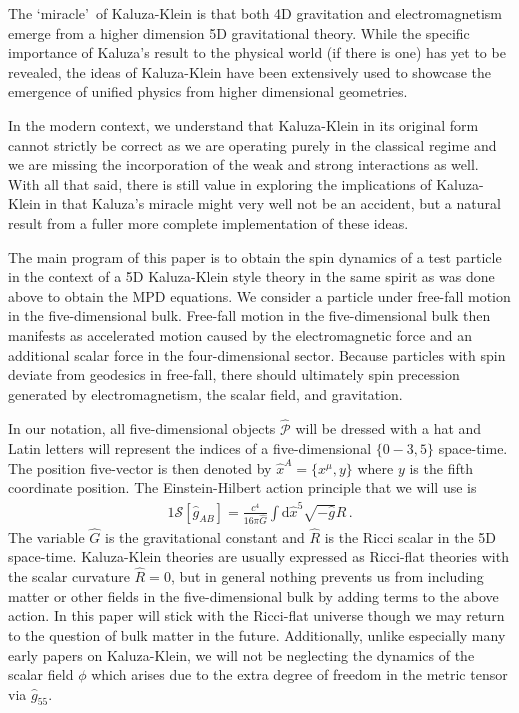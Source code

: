 The \lq miracle\rq\ of Kaluza-Klein is that both 4D gravitation and electromagnetism emerge from a higher dimension 5D gravitational theory. While the specific importance of Kaluza's result to the physical world (if there is one) has yet to be revealed, the ideas of Kaluza-Klein have been extensively used to showcase the emergence of unified physics from higher dimensional geometries. 

In the modern context, we understand that Kaluza-Klein in its original form cannot strictly be correct as we are operating purely in the classical regime and we are missing the incorporation of the weak and strong interactions as well. With all that said, there is still value in exploring the implications of Kaluza-Klein in that Kaluza's miracle might very well not be an accident, but a natural result from a fuller more complete implementation of these ideas.

The main program of this paper is to obtain the spin dynamics of a test particle in the context of a 5D Kaluza-Klein style theory in the same spirit as was done above to obtain the MPD equations. We consider a particle under free-fall motion in the five-dimensional bulk. Free-fall motion in the five-dimensional bulk then manifests as accelerated motion caused by the electromagnetic force and an additional scalar force in the four-dimensional sector. Because particles with spin deviate from geodesics in free-fall, there should ultimately spin precession generated by electromagnetism, the scalar field, and gravitation.

In our notation, all five-dimensional objects $\hat{\mathcal{P}}$ will be dressed with a hat and Latin letters will represent the indices of a five-dimensional $\{0-3,5\}$ space-time. The position five-vector is then denoted by $\hat{x}^{A}=\{x^{\mu},y\}$ where $y$ is the fifth coordinate position. The Einstein-Hilbert action principle that we will use is
\begin{alignat}{1}
	\label{KALUZA01} \mathcal{S}[\hat{g}_{AB}]=\frac{c^{4}}{16\pi\hat{G}}\int\mathrm{d}\hat{x}^{5}\sqrt{-\hat{g}}\hat{R}\,.
\end{alignat}
The variable $\hat{G}$ is the gravitational constant and $\hat{R}$ is the Ricci scalar in the 5D space-time. Kaluza-Klein theories are usually expressed as Ricci-flat theories with the scalar curvature $\hat{R}=0$, but in general nothing prevents us from including matter or other fields in the five-dimensional bulk by adding terms to the above action. In this paper will stick with the Ricci-flat universe though we may return to the question of bulk matter in the future. Additionally, unlike especially many early papers on Kaluza-Klein, we will not be neglecting the dynamics of the scalar field $\phi$ which arises due to the extra degree of freedom in the metric tensor via $\hat{g}_{55}$. 

